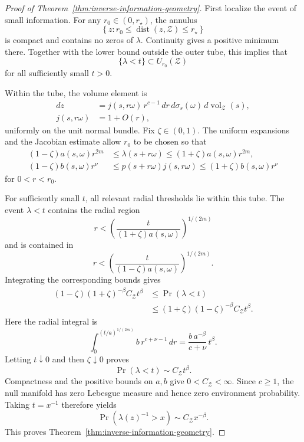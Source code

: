 \begin{proof}[Proof of Theorem~\ref{thm:inverse-information-geometry}]

First localize the event of small information. For any \(r_0\in(0,r_\star)\), the annulus
\[
\left\{
z:
r_0\le\operatorname{dist}(z,\mathcal Z)\le r_\star
\right\}
\]
is compact and contains no zeros of \(\lambda\). Continuity gives a positive minimum there. Together with the lower bound outside the outer tube, this implies that
\[
\{\lambda<t\}\subset U_{r_0}(\mathcal Z)
\]
for all sufficiently small \(t>0\).

Within the tube, the volume element is
\[
\begin{aligned}
dz
&=
j(s,r\omega)\,r^{c-1}
\,dr\,d\sigma_s(\omega)\,
d\operatorname{vol}_{\mathcal Z}(s),
\\
j(s,r\omega)
&=
1+O(r),
\end{aligned}
\tag{A.9}\label{eq:app-tube-jacobian}
\]
uniformly on the unit normal bundle. Fix \(\zeta\in(0,1)\). The uniform expansions and the Jacobian estimate allow \(r_0\) to be chosen so that
\[
\begin{aligned}
(1-\zeta)a(s,\omega)r^{2m}
&\le
\lambda(s+r\omega)
\le
(1+\zeta)a(s,\omega)r^{2m},
\\
(1-\zeta)b(s,\omega)r^\nu
&\le
p(s+r\omega)j(s,r\omega)
\le
(1+\zeta)b(s,\omega)r^\nu
\end{aligned}
\tag{A.10}\label{eq:app-uniform-tube-bounds}
\]
for \(0<r<r_0\).

For sufficiently small \(t\), all relevant radial thresholds lie within this tube. The event \(\lambda<t\) contains the radial region
\[
r<
\left(
\frac{t}{(1+\zeta)a(s,\omega)}
\right)^{1/(2m)}
\]
and is contained in
\[
r<
\left(
\frac{t}{(1-\zeta)a(s,\omega)}
\right)^{1/(2m)}.
\]
Integrating the corresponding bounds gives
\[
\begin{aligned}
(1-\zeta)(1+\zeta)^{-\beta}C_{\mathcal Z}t^\beta
&\le
\Pr(\lambda<t)
\\
&\le
(1+\zeta)(1-\zeta)^{-\beta}C_{\mathcal Z}t^\beta.
\end{aligned}
\tag{A.11}\label{eq:app-small-information-sandwich}
\]
Here the radial integral is
\[
\int_0^{(t/a)^{1/(2m)}}
b\,r^{c+\nu-1}\,dr
=
\frac{b\,a^{-\beta}}{c+\nu}\,t^\beta.
\]
Letting \(t\downarrow0\) and then \(\zeta\downarrow0\) proves
\[
\Pr(\lambda<t)\sim C_{\mathcal Z}t^\beta.
\]
Compactness and the positive bounds on \(a,b\) give \(0<C_{\mathcal Z}<\infty\). Since \(c\ge1\), the null manifold has zero Lebesgue measure and hence zero environment probability. Taking \(t=x^{-1}\) therefore yields
\[
\Pr\!\left(\lambda(z)^{-1}>x\right)
\sim
C_{\mathcal Z}x^{-\beta}.
\tag{A.12}\label{eq:app-geometric-tail}
\]
This proves Theorem~\ref{thm:inverse-information-geometry}. \end{proof}

